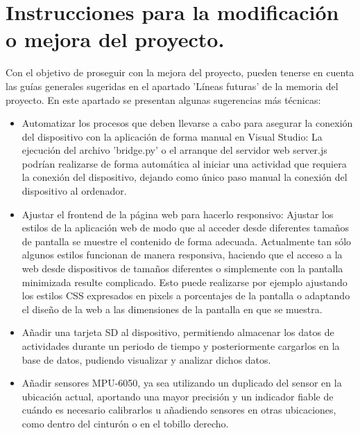 \section{Instrucciones para la modificación o mejora del proyecto.}
Con el objetivo de proseguir con la mejora del proyecto, pueden tenerse en cuenta las guías generales sugeridas en el apartado 'Líneas futuras' de la memoria del proyecto. En este apartado se presentan algunas sugerencias más técnicas:
\begin{itemize}
    \item Automatizar los procesos que deben llevarse a cabo para asegurar la conexión del dispositivo con la aplicación de forma manual en Visual Studio: La ejecución del archivo 'bridge.py' o el arranque del servidor web server.js podrían realizarse de forma automática al iniciar una actividad que requiera la conexión del dispositivo, dejando como único paso manual la conexión del dispositivo al ordenador.
    \item Ajustar el frontend de la página web para hacerlo responsivo: Ajustar los estilos de la aplicación web de modo que al acceder desde diferentes tamaños de pantalla se muestre el contenido de forma adecuada. Actualmente tan sólo algunos estilos funcionan de manera responsiva, haciendo que el acceso a la web desde dispositivos de tamaños diferentes o simplemente con la pantalla minimizada resulte complicado. Esto puede realizarse por ejemplo ajustando los estilos CSS expresados en pixels a porcentajes de la pantalla o adaptando el diseño de la web a las dimensiones de la pantalla en que se muestra.
    \item Añadir una tarjeta SD al dispositivo, permitiendo almacenar los datos de actividades durante un periodo de tiempo y posteriormente cargarlos en la base de datos, pudiendo visualizar y analizar dichos datos.
    \item Añadir sensores MPU-6050, ya sea utilizando un duplicado del sensor en la ubicación actual, aportando una mayor precisión y un indicador fiable de cuándo es necesario calibrarlos u añadiendo sensores en otras ubicaciones, como dentro del cinturón o en el tobillo derecho.
\end{itemize}
